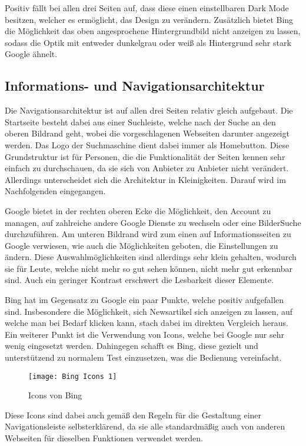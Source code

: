 Positiv fällt bei allen drei Seiten auf, dass diese einen einstellbaren Dark Mode besitzen, welcher es ermöglicht, das Design zu verändern.
Zusätzlich bietet Bing die Möglichkeit das oben angesprochene Hintergrundbild nicht anzeigen zu lassen,
sodass die Optik mit entweder dunkelgrau oder weiß als Hintergrund sehr stark Google ähnelt.

\subsection{Informations- und Navigationsarchitektur}\label{subsec:informations--und-navigationsarchitektur}
Die Navigationsarchitektur ist auf allen drei Seiten relativ gleich aufgebaut.
Die Startseite besteht dabei aus einer Suchleiste,
welche nach der Suche an den oberen Bildrand geht, wobei die vorgeschlagenen Webseiten darunter angezeigt werden.
Das Logo der Suchmaschine dient dabei immer als Homebutton.
Diese Grundstruktur ist für Personen, die die Funktionalität der
Seiten kennen sehr einfach zu durchschauen, da sie sich von Anbieter zu Anbieter nicht verändert.
Allerdings unterscheidet sich die Architektur in Kleinigkeiten.
Darauf wird im Nachfolgenden eingegangen.

Google bietet in der rechten oberen Ecke die Möglichkeit, den Account zu managen, auf zahlreiche andere Google Dienste zu
wechseln oder eine Bilder\-Suche durchzuführen.
Am unteren Bildrand wird zum einen auf Informationsseiten zu Google verwiesen,
wie auch die Möglichkeiten geboten, die Einstellungen zu ändern.
Diese Auswahlmöglichkeiten sind allerdings sehr klein gehalten,
wodurch sie für Leute, welche nicht mehr so gut sehen können, nicht mehr gut erkennbar sind.
Auch ein geringer Kontrast erschwert die Lesbarkeit dieser Elemente.

Bing hat im Gegensatz zu Google ein paar Punkte, welche positiv aufgefallen sind.
Insbesondere die Möglichkeit, sich Newsartikel sich anzeigen zu lassen,
auf welche man bei Bedarf klicken kann, stach dabei im direkten Vergleich heraus.
Ein weiterer Punkt ist die Verwendung von Icons, welche bei Google nur sehr wenig eingesetzt werden.
Dahingegen schafft es Bing, diese gezielt und unterstützend zu normalem Test einzusetzen, was die Bedienung vereinfacht.
\begin{figure}[ht]
    \centering
    \texttt{[image: Bing Icons 1]}
    \caption{Icons von Bing}\label{fig:figure8}
\end{figure}
Diese Icons sind dabei auch gemäß den Regeln
für die Gestaltung einer Navigationsleiste\autocite[Seite 17]{Maulhardt.20220621b} selbsterklärend, da sie alle standardmäßig auch von
anderen Webseiten für dieselben Funktionen verwendet werden.

